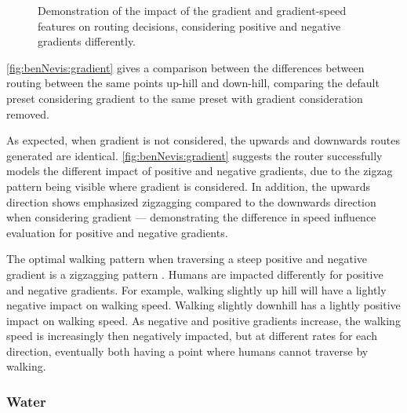 \documentclass[12pt]{article}
\begin{document}
\begin{figure}[H]
{  }
  \caption{Demonstration of the impact of the gradient and gradient-speed features on routing decisions, considering positive and negative gradients differently.}
  \label{fig:benNevis:gradient}
\end{figure}

\autoref{fig:benNevis:gradient} gives a comparison between the differences between routing between the same points up-hill and down-hill, comparing the default preset considering gradient to the same preset with gradient consideration removed.

As expected, when gradient is not considered, the upwards and downwards routes generated are identical. \autoref{fig:benNevis:gradient} suggests the router successfully models the different impact of positive and negative gradients, due to the zigzag pattern being visible where gradient is considered. In addition, the upwards direction shows emphasized zigzagging compared to the downwards direction when considering gradient --- demonstrating the difference in speed influence evaluation for positive and negative gradients.

The optimal walking pattern when traversing a steep positive and negative gradient is a zigzagging pattern \autocite{horiuchi2015comparisons}. Humans are impacted differently for positive and negative gradients. For example, walking slightly up hill will have a lightly negative impact on walking speed. Walking slightly downhill has a lightly positive impact on walking speed. As negative and positive gradients increase, the walking speed is increasingly then negatively impacted, but at different rates for each direction, eventually both having a point where humans cannot traverse by walking.

\subsubsection{Water}
\end{document}
